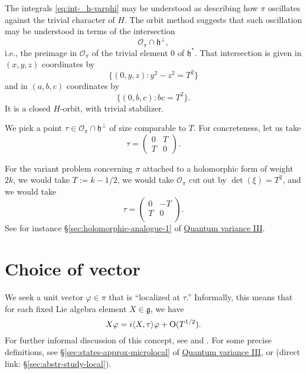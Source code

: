 \documentclass[reqno]{amsart} 
\numberwithin{equation}{section}
\numberwithin{theorem}{section}
\begin{document}
The integrals \eqref{eq:int-_h-varphi} may be understood as describing how $\pi$ oscillates against the trivial character of $H$.  The orbit method suggests \cite[\S1.9]{nelson-venkatesh-1} that such oscillation may be understood in terms of the intersection
\begin{equation*}
  \mathcal{O}_\pi \cap \mathfrak{h}^\perp,
\end{equation*}
i.e., the preimage in $\mathcal{O}_\pi$ of the trivial element $0$ of $\mathfrak{h}^*$.  That intersection is given in $(x,y,z)$ coordinates by
\begin{equation*}
  \{(0,y,z) : y^2 - z^2 = T^2\}
\end{equation*}
and in $(a,b,c)$ coordinates by
\begin{equation*}
  \{(0,b,c) : b c = T^2\}.
\end{equation*}
It is a closed $H$-orbit, with trivial stabilizer.

We pick a point $\tau \in \mathcal{O}_\pi \cap \mathfrak{h}^\perp$ of size comparable to $T$.  For concreteness, let us take
\begin{equation*}
  \tau = \begin{pmatrix}
    0 & T \\
    T & 0
  \end{pmatrix}.
\end{equation*}

\begin{remark}
  For the variant problem concerning $\pi$ attached to a holomorphic form of weight $2 k$, we would take $T := k - 1/2$, we would take $\mathcal{O}_\pi$ cut out by $\det(\xi) = T^2$, and we would take
  \begin{equation*}
\tau =
\begin{pmatrix}
0 & -T \\
T & 0 \\
\end{pmatrix}.
\end{equation*}
See for instance \S\ref{sec:holomorphic-analogue-1} of \href{var-quat-3-submitted.pdf}{Quantum variance III}.
\end{remark}


\section{Choice of vector}\label{sec:org806411a}
We seek a unit vector $\varphi \in \pi$ that is ``localized at $\tau$.''  Informally, this means that for each fixed Lie algebra element $X \in \mathfrak{g}$, we have
\begin{equation}\label{eq:x-varphi-=}
  X \varphi = {i \langle X, \tau  \rangle} \varphi + \operatorname{O}(T^{1/2}).
\end{equation}
For further informal discussion of this concept, see \cite[\S1.7]{nelson-venkatesh-1} and \cite[\S2.5]{2020arXiv201202187N} .  For some precise definitions, see \S\ref{sec:states-approx-microlocal} of \href{var-quat-3-submitted.pdf}{Quantum variance III}, or \cite[\S14]{2021arXiv210915230N} (direct link: \S\ref{sec:abstr-study-local}).
\end{document}
